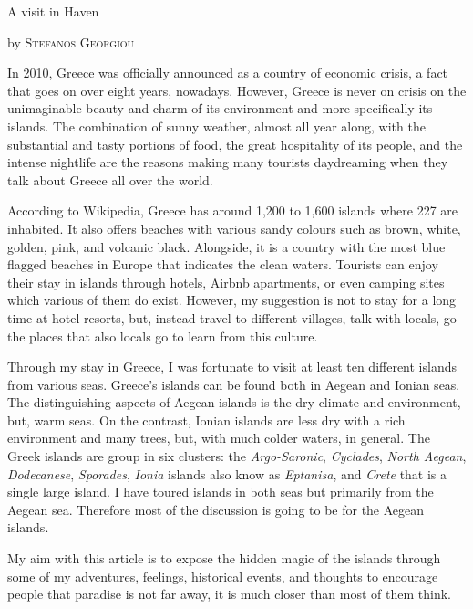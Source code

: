 \documentclass[10pt,a4paper]{article} %
\newcommand{\NewsItem}[1]{ %
\usefont{T1}{fvs}{n}{n} %
\vspace{24pt}\large #1\vspace{3pt} %
\par \normalsize \normalfont}
\newcommand{\NewsAuthor}[1]{ %
\hfill by \textsc{#1} \vspace{20pt} %
\par \normalfont}
\begin{document}
\begin{multicols}{3} %


\NewsItem{A visit in Haven}
\NewsAuthor{Stefanos Georgiou}
In 2010, Greece was officially announced as a country of economic crisis, 
a fact that goes on over eight years, nowadays. 
However, Greece is never on crisis on the unimaginable beauty and charm 
of its environment and more specifically its islands. 
The combination of sunny weather, almost all year along,
with the substantial and tasty portions of food, the great hospitality of its people, and the 
intense nightlife are the reasons making many tourists daydreaming when they talk 
about Greece all over the world.

According to Wikipedia, Greece has around 1,200 to 1,600 islands where 227 
are inhabited. 
It also offers beaches with various sandy colours such as brown, white, golden, 
pink, and volcanic black. 
Alongside, it is a country with the most blue flagged beaches in Europe that 
indicates the clean waters. 
Tourists can enjoy their stay in islands through hotels, Airbnb apartments, 
or even camping sites which various of them do exist. 
However, my suggestion is not to stay for a long time at hotel resorts, but, instead 
travel to different villages, talk with locals, go the places that also locals 
go to learn from this culture.

Through my stay in Greece,
I was fortunate to visit at least ten different islands from various seas.
Greece's islands can be found both in Aegean and Ionian seas. 
The distinguishing aspects of Aegean islands is the dry climate and environment,
but, warm seas. 
On the contrast, Ionian islands are less dry with a rich environment
and many trees, but, with much colder waters, in general. 
The Greek islands are group in six clusters: the \textit{Argo-Saronic},
\textit{Cyclades}, \textit{North Aegean}, \textit{Dodecanese},
\textit{Sporades}, \textit{Ionia} islands also know as \textit{Eptanisa}, 
and \textit{Crete} that is a single large island.
I have toured islands in both seas but primarily from the Aegean sea. 
Therefore most of the discussion is going to be for the Aegean islands. 

My aim with this article is to expose the hidden magic of the islands
through some of my adventures, feelings, historical events,
and thoughts to encourage people that paradise is not far away,
it is much closer than most of them think. 
  

\end{multicols}
\end{document}

